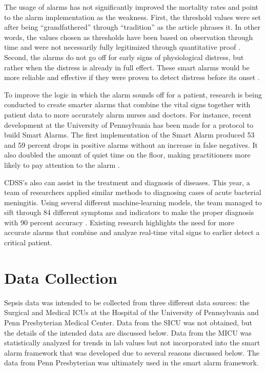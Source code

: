 \documentclass{sig-alternate}
\begin{document}
The usage of alarms has not significantly improved the mortality rates and point to the alarm implementation as the weakness. First, the threshold values were set after being ``grandfathered'' through ``tradition'' as the article phrases it. In other words, the values chosen as thresholds have been based on observation through time and were not necessarily fully legitimized through quantitative proof \cite{deaths}. Second, the alarms do not go off for early signs of physiological distress, but rather when the distress is already in full effect. These smart alarms would be more reliable and effective if they were proven to detect distress before its onset \cite{deaths}.  

To improve the logic in which the alarm sounds off for a patient, research is being conducted to create smarter alarms that combine the vital signs together with patient data to more accurately alarm nurses and doctors. For instance, recent development at the University of Pennsylvania has been made for a protocol to build Smart Alarms. The first implementation of the Smart Alarm produced 53 and 59 percent drops in positive alarms without an increase in false negatives. It also doubled the amount of quiet time on the floor, making practitioners more likely to pay attention to the alarm \cite{smart_alarm}.

CDSS's also can assist in the treatment and diagnosis of diseases. This year, a team of researchers applied similar methods to diagnosing cases of acute bacterial meningitis. Using several different machine-learning models, the team managed to sift through 84 different symptoms and indicators to make the proper diagnosis with 90 percent accuracy \cite{bayes}. Existing research highlights the need for more accurate alarms that combine and analyze real-time vital signs to earlier detect a critical patient. 

\vspace{10pt}
\section{Data Collection}
\vspace{10pt}
\label{sec:data}

Sepsis data was intended to be collected from three different data sources: the Surgical and Medical ICUs at the Hospital of the University of Pennsylvania and Penn Presbyterian Medical Center.  Data from the SICU was not obtained, but the details of the intended data are discussed below.  Data from the MICU was statistically analyzed for trends in lab values but not incorporated into the smart alarm framework that was developed due to several reasons discussed below.  The data from Penn Presbyterian was ultimately used in the smart alarm framework.
\end{document}

